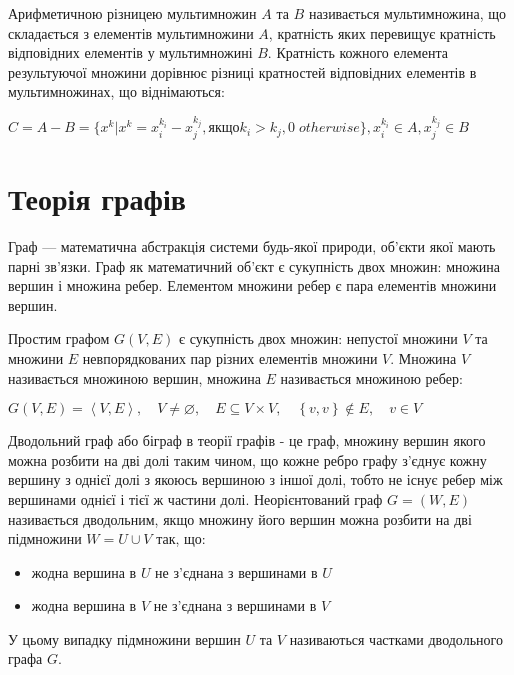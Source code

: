 \begin{definition}
Арифметичною різницею мультимножин  \cite{Kapitonova:2004} $A$ та $B$ називається мультимножина, що складається з елементів мультимножини $A$, кратність яких перевищує кратність відповідних елементів у мультимножині $B$. Кратність кожного елемента результуючої множини дорівнює різниці кратностей відповідних елементів в мультимножинах, що віднімаються:
\begin{center}
$C = A-B = \{x^k | x^k = x_i^{k_i}-x_j^{k_j}, якщо k_i>k_j, 0 \; otherwise \},  x_i^{k_i} \in A, x_j^{k_j} \in B$
\end{center}
\end{definition}


\section{Теорія графів}

\begin{definition}
Граф — математична абстракція системи будь-якої природи, об'єкти якої мають парні зв'язки. Граф як математичний об'єкт є сукупність двох множин: множина вершин і множина ребер. Елементом множини ребер є пара елементів множини вершин.
\end{definition}

\begin{definition}
Простим графом $G(V,E)$ є сукупність двох множин: непустої множини $V$ та множини $E$ невпорядкованих пар різних елементів множини $V$. Множина $V$ називається множиною вершин, множина $E$ називається множиною ребер:
\begin{center}
$ G(V,E)=\left\langle V,E\right\rangle ,\quad V\neq \varnothing ,\quad E\subseteq V\times V,\quad \left\{v,v\right\}\notin E,\quad v\in V$
\end{center}
\end{definition}

\begin{definition}
Дводольний граф або біграф в теорії графів - це граф, множину вершин якого можна розбити на дві долі таким чином, що кожне ребро графу з'єднує кожну вершину з однієї долі з якоюсь вершиною з іншої долі, тобто не існує ребер між вершинами однієї і тієї ж частини долі. Неорієнтований граф $G=(W,E)$ називається дводольним, якщо множину його вершин можна розбити на дві підмножини $ W = U \cup V $ так, що:
\begin{itemize}
\item жодна вершина в $U$ не з'єднана з вершинами в $U$
\item жодна вершина в $V$ не з'єднана з вершинами в $V$
\end{itemize}

У цьому випадку підмножини вершин $U$ та $V$ називаються частками дводольного графа $G$.
\end{definition}



